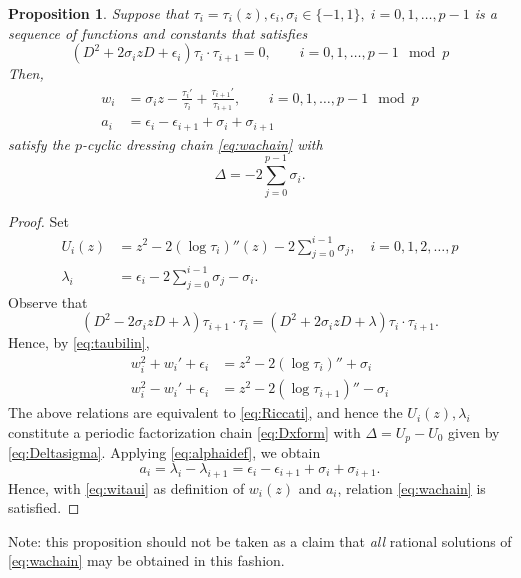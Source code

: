 \documentclass{amsart}
\newtheorem{proposition}{Proposition}
\theoremstyle{definition}
\begin{document}
\begin{proposition}
  \label{prop:tauchain}
  Suppose that
  $\tau_i=\tau_i(z),\epsilon_i,\sigma_i\in \{ -1,1\},\; i=0,1,\ldots,
  p-1$ is a sequence of functions and constants that satisfies
  \begin{equation}
    \label{eq:tauchain}
    (D^2+2\sigma_i zD+\epsilon_i) \tau_i \cdot \tau_{i+1}=0,\qquad
    i=0,1,\ldots, p-1      \mod p
  \end{equation}
  Then,
  \begin{align}
    \label{eq:witaui}
    w_i &= \sigma_iz- \frac{\tau_{i}'}{\tau_{i}} +
      \frac{\tau_{i+1}'}{\tau_{i+1}}, \qquad
    i=0,1,\ldots, p-1  \mod p\\ \nonumber
    a_i &= \epsilon_i- \epsilon_{i+1}+\sigma_i+\sigma_{i+1}
  \end{align}
  satisfy the $p$-cyclic dressing chain \eqref{eq:wachain} with
  \begin{equation}
    \label{eq:Deltasigma}
     \Delta = -2 \sum_{j=0}^{p-1} \sigma_i.
  \end{equation}
\end{proposition}
\begin{proof}
  Set
  \begin{align*}
    U_i(z) &= z^2 - 2 (\log \tau_i)''(z) -2
             \sum_{j=0}^{i-1}\sigma_j,\quad i=0,1,2,\ldots, p \\
    \lambda_i &=\epsilon_i-2\sum_{j=0}^{i-1} \sigma_j -\sigma_i.
  \end{align*}
  Observe that
  \[ (D^2-2\sigma_izD + \lambda) \tau_{i+1} \cdot \tau_i =
    (D^2+2\sigma_i zD +\lambda) \tau_i \cdot \tau_{i+1}.\]
  Hence, by \eqref{eq:taubilin},
  \begin{align*}
    w_i^2+w_i'+ \epsilon_i
    &= z^2 - 2 (\log \tau_i)'' + \sigma_i\\
    w_{i}^2-w_{i}'+ \epsilon_i
    &= z^2 - 2 (\log      \tau_{i+1})'' - \sigma_i 
  \end{align*}
  The above relations are equivalent to \eqref{eq:Riccati}, and hence
  the $U_i(z),\lambda_i$ constitute a periodic factorization chain
  \eqref{eq:Dxform} with $\Delta=U_p-U_0$ given by
  \eqref{eq:Deltasigma}.  Applying \eqref{eq:alphaidef}, we obtain
  \[ a_i = \lambda_i-\lambda_{i+1} = \epsilon_i-\epsilon_{i+1} +
    \sigma_i + \sigma_{i+1}.\] Hence, with \eqref{eq:witaui} as
  definition of $w_i(z)$ and $a_i$, relation \eqref{eq:wachain} is
  satisfied.
\end{proof}
\noindent
Note: this proposition should not be taken as a claim that \emph{all}
rational solutions of \eqref{eq:wachain} may be obtained in this
fashion.
\end{document}
